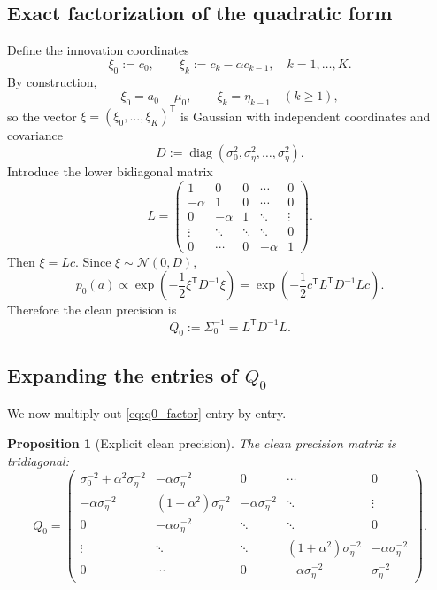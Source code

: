 \documentclass[11pt]{article}
\newtheorem{proposition}{Proposition}[section]
\newcommand{\diag}{\operatorname{diag}}
\newcommand{\trans}{\mathsf{T}}
\newcommand{\Ncal}{\mathcal{N}}
\begin{document}
\subsection{Exact factorization of the quadratic form}
Define the innovation coordinates
\[
\xi_0:=c_0,
\qquad
\xi_k:=c_k-\alpha c_{k-1},\quad k=1,\dots,K.
\]
By construction,
\[
\xi_0=a_0-\mu_0,
\qquad
\xi_k=\eta_{k-1}\quad (k\ge 1),
\]
so the vector $\xi=(\xi_0,\dots,\xi_K)^\trans$ is Gaussian with independent coordinates and covariance
\[
D:=\diag(\sigma_0^2,\sigma_\eta^2,\dots,\sigma_\eta^2).
\]
Introduce the lower bidiagonal matrix
\[
L=
\begin{pmatrix}
1 & 0 & 0 & \cdots & 0 \\
-\alpha & 1 & 0 & \cdots & 0 \\
0 & -\alpha & 1 & \ddots & \vdots \\
\vdots & \ddots & \ddots & \ddots & 0 \\
0 & \cdots & 0 & -\alpha & 1
\end{pmatrix}.
\]
Then $\xi=Lc$. Since $\xi\sim\Ncal(0,D)$,
\[
p_0(a)
\propto
\exp\!\left(-\frac12\xi^\trans D^{-1}\xi\right)
=
\exp\!\left(-\frac12 c^\trans L^\trans D^{-1}L c\right).
\]
Therefore the clean precision is
\begin{equation}\label{eq:q0_factor}
Q_0:=\Sigma_0^{-1}=L^\trans D^{-1}L.
\end{equation}

\subsection{Expanding the entries of $Q_0$}
We now multiply out \eqref{eq:q0_factor} entry by entry.
\begin{proposition}[Explicit clean precision]\label{prop:q0}
The clean precision matrix is tridiagonal:
\begin{equation}\label{eq:q0_explicit}
Q_0=
\begin{pmatrix}
\sigma_0^{-2}+\alpha^2\sigma_\eta^{-2} & -\alpha\sigma_\eta^{-2} & 0 & \cdots & 0 \\
-\alpha\sigma_\eta^{-2} & (1+\alpha^2)\sigma_\eta^{-2} & -\alpha\sigma_\eta^{-2} & \ddots & \vdots \\
0 & -\alpha\sigma_\eta^{-2} & \ddots & \ddots & 0 \\
\vdots & \ddots & \ddots & (1+\alpha^2)\sigma_\eta^{-2} & -\alpha\sigma_\eta^{-2} \\
0 & \cdots & 0 & -\alpha\sigma_\eta^{-2} & \sigma_\eta^{-2}
\end{pmatrix}.
\end{equation}
\end{proposition}
\end{document}
